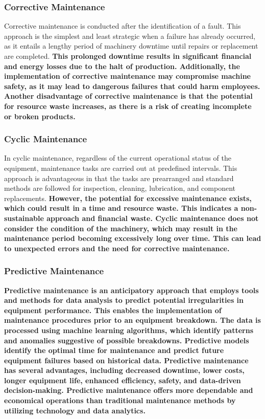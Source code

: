 \subsubsection{Corrective Maintenance}
Corrective maintenance is conducted after the identification of a fault. This approach is the simplest and least strategic when a failure has already occurred, as it entails a lengthy period of machinery downtime until repairs or replacement are completed. \textbf{This prolonged downtime results in significant financial and energy losses due to the halt of production. Additionally, the implementation of corrective maintenance may compromise machine safety, as it may lead to dangerous failures that could harm employees.  Another disadvantage of corrective maintenance is that the potential for resource waste increases, as there is a risk of creating incomplete or broken products.}
\subsubsection{Cyclic Maintenance}
In cyclic maintenance, regardless of the current operational status of the equipment, maintenance tasks are carried out at predefined intervals. This approach is advantageous in that the tasks are prearranged and standard methods are followed for inspection, cleaning, lubrication, and component replacements. \textbf{However, the potential for excessive maintenance exists, which could result in a time and resource waste. This indicates a non-sustainable approach and financial waste. Cyclic maintenance does not consider the condition of the machinery, which may result in the maintenance period becoming excessively long over time. This can lead to unexpected errors and the need for corrective maintenance.}
\subsubsection{Predictive Maintenance}
\textbf{Predictive maintenance is an anticipatory approach that employs tools and methods for data analysis to predict potential irregularities in equipment performance. This enables the implementation of maintenance procedures prior to an equipment breakdown.
The data is processed using machine learning algorithms, which identify patterns and anomalies suggestive of possible breakdowns. Predictive models identify the optimal time for maintenance and predict future equipment failures based on historical data. Predictive maintenance has several advantages, including decreased downtime, lower costs, longer equipment life, enhanced efficiency, safety, and data-driven decision-making. Predictive maintenance offers more dependable and economical operations than traditional maintenance methods by utilizing technology and data analytics.}
















